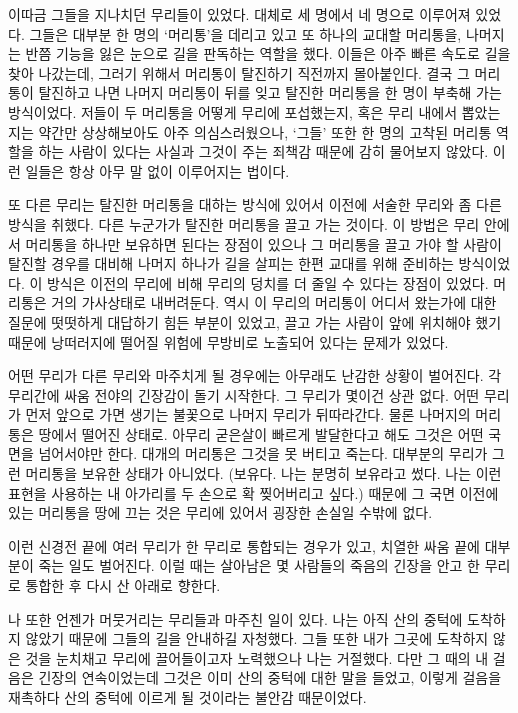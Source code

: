 이따금 그들을 지나치던 무리들이 있었다. 대체로 세 명에서 네 명으로 이루어져 있었다. 그들은 대부분 한 명의 `머리통'을 데리고 있고 또 하나의 교대할 머리통을, 나머지는 반쯤 기능을 잃은 눈으로 길을 판독하는 역할을 했다. 이들은 아주 빠른 속도로 길을 찾아 나갔는데, 그러기 위해서 머리통이 탈진하기 직전까지 몰아붙인다. 결국 그 머리통이 탈진하고 나면 나머지 머리통이 뒤를 잊고 탈진한 머리통을 한 명이 부축해 가는 방식이었다. 저들이 두 머리통을 어떻게 무리에 포섭했는지, 혹은 무리 내에서 뽑았는지는 약간만 상상해보아도 아주 의심스러웠으나, `그들' 또한 한 명의 고착된 머리통 역할을 하는 사람이 있다는 사실과 그것이 주는 죄책감 때문에 감히 물어보지 않았다. 이런 일들은 항상 아무 말 없이 이루어지는 법이다.



또 다른 무리는 탈진한 머리통을 대하는 방식에 있어서 이전에 서술한 무리와 좀 다른 방식을 취했다. 다른 누군가가 탈진한 머리통을 끌고 가는 것이다. 이 방법은 무리 안에서 머리통을 하나만 보유하면 된다는 장점이 있으나 그 머리통을 끌고 가야 할 사람이 탈진할 경우를 대비해 나머지 하나가 길을 살피는 한편 교대를 위해 준비하는 방식이었다. 이 방식은 이전의 무리에 비해 무리의 덩치를 더 줄일 수 있다는 장점이 있었다. 머리통은 거의 가사상태로 내버려둔다. 역시 이 무리의 머리통이 어디서 왔는가에 대한 질문에 떳떳하게 대답하기 힘든 부분이 있었고, 끌고 가는 사람이 앞에 위치해야 했기 때문에 낭떠러지에 떨어질 위험에 무방비로 노출되어 있다는 문제가 있었다.



어떤 무리가 다른 무리와 마주치게 될 경우에는 아무래도 난감한 상황이 벌어진다. 각 무리간에 싸움 전야의 긴장감이 돌기 시작한다. 그 무리가 몇이건 상관 없다. 어떤 무리가 먼저 앞으로 가면 생기는 불꽃으로 나머지 무리가 뒤따라간다. 물론 나머지의 머리통은 땅에서 떨어진 상태로. 아무리 굳은살이 빠르게 발달한다고 해도 그것은 어떤 국면을 넘어서야만 한다. 대개의 머리통은 그것을 못 버티고 죽는다. 대부분의 무리가 그런 머리통을 보유한 상태가 아니었다. (보유다. 나는 분명히 보유라고 썼다. 나는 이런 표현을 사용하는 내 아가리를 두 손으로 확 찢어버리고 싶다.) 때문에 그 국면 이전에 있는 머리통을 땅에 끄는 것은 무리에 있어서 굉장한 손실일 수밖에 없다.



이런 신경전 끝에 여러 무리가 한 무리로 통합되는 경우가 있고, 치열한 싸움 끝에 대부분이 죽는 일도 벌어진다. 이럴 때는 살아남은 몇 사람들의 죽음의 긴장을 안고 한 무리로 통합한 후 다시 산 아래로 향한다.



나 또한 언젠가 머뭇거리는 무리들과 마주친 일이 있다. 나는 아직 산의 중턱에 도착하지 않았기 때문에 그들의 길을 안내하길 자청했다. 그들 또한 내가 그곳에 도착하지 않은 것을 눈치채고 무리에 끌어들이고자 노력했으나 나는 거절했다. 다만 그 때의 내 걸음은 긴장의 연속이었는데 그것은 이미 산의 중턱에 대한 말을 들었고, 이렇게 걸음을 재촉하다 산의 중턱에 이르게 될 것이라는 불안감 때문이었다.



